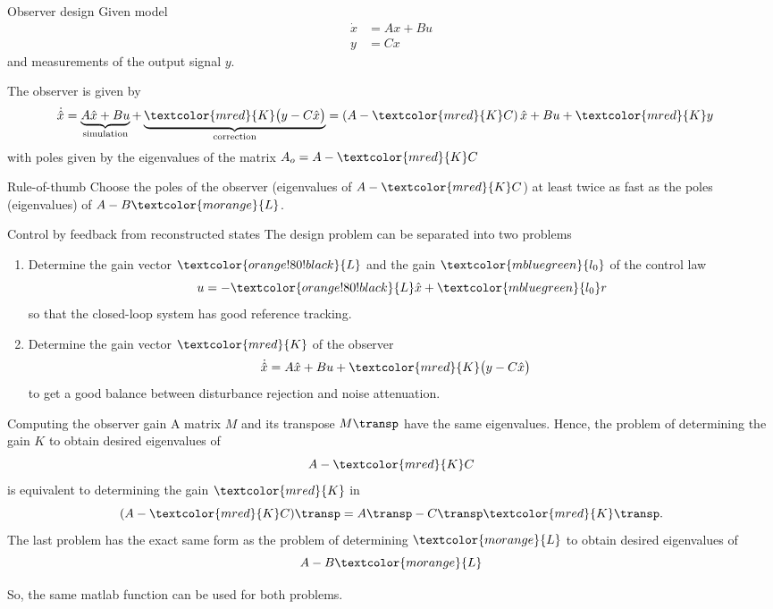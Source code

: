 \documentclass[presentation,aspectratio=169]{beamer}
\begin{document}
\begin{frame}[label={sec:orgd1a7365}]{Observer design}
Given model
 \begin{equation*}
 \begin{split}
  \dot{x} &= A x + B u\\
  y &= C x
 \end{split}
 \label{eq:ssmodel}
\end{equation*}
and measurements of the output signal \(y\). 

The observer is given by
\begin{equation*}
\begin{split}
\dot{\hat{x}} &= \underbrace{A \hat{x} + B u{}}_{\text{simulation}} + \underbrace{\textcolor{mred}{K}\big(y - C\hat{x}\big)}_{\text{correction}} = \left(A - \textcolor{mred}{K}C\right)\hat{x} +  B u{} + \textcolor{mred}{K}y
\end{split}
\end{equation*}
with poles given by the eigenvalues of the matrix \(A_o = A - \textcolor{mred}{K}C\)

\alert{Rule-of-thumb} Choose the poles of the observer (eigenvalues of \(A-\textcolor{mred}{K}C\)) at least twice as fast as the poles (eigenvalues) of \(A-B \textcolor{morange}{L}\).
\end{frame}


\begin{frame}[label={sec:org26932c4}]{Control by feedback from reconstructed states}
The design problem can be separated into two problems
\begin{enumerate}
\item Determine the gain vector \(\textcolor{orange!80!black}{L}\) and the gain \(\textcolor{mbluegreen}{l_0}\) of the control law
\[ u{} = -\textcolor{orange!80!black}{L} \hat{x} + \textcolor{mbluegreen}{l_0} r\]
so that the closed-loop system has good reference tracking.
\item Determine the gain vector \(\textcolor{mred}{K}\) of the observer
\begin{equation*}
\begin{split}
\dot{\hat{x}} &= A \hat{x} + B u{} + \textcolor{mred}{K} \big(y - C\hat{x}\big)
\end{split}
\end{equation*}
to get a good balance between disturbance rejection and noise attenuation.
\end{enumerate}
\end{frame}

\begin{frame}[label={sec:org7c5c7f8}]{Computing the observer gain}
A matrix \(M\) and its transpose \(M\transp\) have the same eigenvalues. Hence, the problem of determining the gain \(K\) to obtain desired eigenvalues of 
\[A- \textcolor{mred}{K}C\] is equivalent to determining the gain \(\textcolor{mred}{K}\) in 
\[(A-\textcolor{mred}{K}C)\transp = A\transp - C\transp \textcolor{mred}{K}\transp.\]
The last problem has the exact same form as the problem of determining \(\textcolor{morange}{L}\) to obtain desired eigenvalues of 
\[A - B \textcolor{morange}{L}\]

So, the same matlab function can be used for both problems.
\end{frame}
\end{document}
